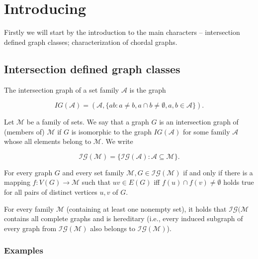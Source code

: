 \chapter{Introducing}

Firstly we will start by the introduction to the main characters -- intersection defined graph classes; characterization of chordal graphs.

\section{Intersection defined graph classes}

\begin{defn}
	The intersection graph of a set family $\mathcal{A}$ is the graph
	
	$$
	IG(\mathcal{A}) = (\mathcal{A}, \{ab : a \neq b, a \cap b \neq \emptyset, a, b \in \mathcal{A}\}).
	$$
\end{defn}

\begin{defn}
	Let $\mathcal{M}$ be a family of sets. We say that a graph $G$ is an intersection graph of (members of) $\mathcal{M}$ if $G$ is isomorphic to the graph $IG(\mathcal{A})$ for some family $\mathcal{A}$ whose all elements belong to $\mathcal{M}$. We write
	
	$$
	\mathcal{IG}(\mathcal{M}) = \{\mathcal{IG}(\mathcal{A}) : \mathcal{A} \subseteq \mathcal{M}\}.
	$$
\end{defn}

\begin{observ}
	For every graph $G$ and every set family $\mathcal{M}, G \in \mathcal{IG}(\mathcal{M})$ if and only if there is a mapping $f : V (G) \to \mathcal{M}$ such that $uv \in E(G)$ iff $f(u) \cap f(v) \neq \emptyset$ holds true for all pairs of distinct vertices $u, v$ of $G$.
\end{observ}

\begin{observ}
	For every family $\mathcal{M}$ (containing at least one nonempty set), it holds that $\mathcal{IG}(\mathcal{M}$ contains all complete graphs and is hereditary (i.e., every induced subgraph of every graph from $\mathcal{IG}(\mathcal{M})$ also	belongs to $\mathcal{IG}(\mathcal{M})$).
\end{observ}

\subsection{Examples}

